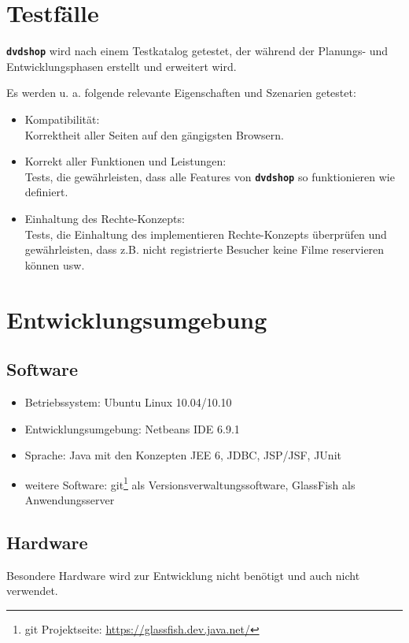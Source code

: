 \documentclass[12pt,oneside,a4paper,bibtotoc,liststotoc,pointlessnumbers]{scrartcl}
\begin{document}
\newpage
\section{Testfälle}
\texttt{\textbf{dvdshop}} wird nach einem Testkatalog getestet, der während der Planungs- und Entwicklungsphasen erstellt und erweitert wird.\par
Es werden u. a. folgende relevante Eigenschaften und Szenarien getestet:
\begin{itemize}
\item Kompatibilität: \\Korrektheit aller Seiten auf den gängigsten Browsern.
\item Korrekt aller Funktionen und Leistungen: \\Tests, die gewährleisten, dass alle Features von \texttt{\textbf{dvdshop}} so funktionieren wie definiert.
\item Einhaltung des Rechte-Konzepts: \\Tests, die Einhaltung des implementieren Rechte-Konzepts überprüfen und gewährleisten, dass z.B. nicht registrierte Besucher keine Filme reservieren können usw.
\end{itemize}

\newpage
\section{Entwicklungsumgebung}
\subsection{Software}
\begin{itemize}
\item Betriebssystem: Ubuntu Linux 10.04/10.10
\item Entwicklungsumgebung: Netbeans IDE 6.9.1
\item Sprache: Java mit den Konzepten JEE 6, JDBC, JSP/JSF, JUnit
\item weitere Software: git\footnote{git Projektseite: \url{https://glassfish.dev.java.net/}} als Versionsverwaltungssoftware, GlassFish als Anwendungsserver
\end{itemize}
\subsection{Hardware}
Besondere Hardware wird zur Entwicklung nicht benötigt und auch nicht verwendet.

\newpage
\end{document}
